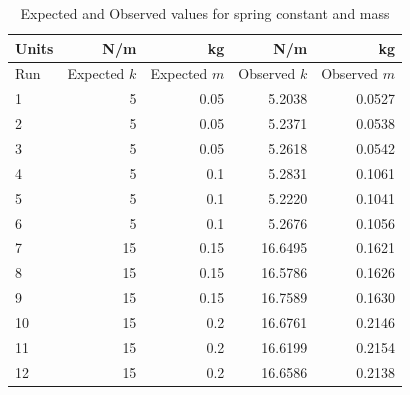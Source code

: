 \begin{table}[ht]
    \centering
    \begin{tabular}{|l|r|r|r|r|}
        \hline
        Units & N/m & kg & N/m & kg \\
        \hline
        Run & Expected $k$ & Expected $m$ & Observed $k$ & Observed $m$ \\
        \hline
        1 & 5 & 0.05 & 5.2038 & 0.0527 \\
        2 & 5 & 0.05 & 5.2371 & 0.0538 \\
        3 & 5 & 0.05 & 5.2618 & 0.0542 \\
        \hline
        4 & 5 & 0.1 & 5.2831 & 0.1061 \\
        5 & 5 & 0.1 & 5.2220 & 0.1041 \\
        6 & 5 & 0.1 & 5.2676 & 0.1056 \\
        \hline
        7 & 15 & 0.15 & 16.6495 & 0.1621 \\
        8 & 15 & 0.15 & 16.5786 & 0.1626 \\
        9 & 15 & 0.15 & 16.7589 & 0.1630 \\
        \hline
        10 & 15 & 0.2 & 16.6761 & 0.2146 \\
        11 & 15 & 0.2 & 16.6199 & 0.2154 \\
        12 & 15 & 0.2 & 16.6586 & 0.2138 \\
        \hline
    \end{tabular}
    \caption{Expected and Observed values for spring constant and mass}
    \label{table.11.k.m}
\end{table}
